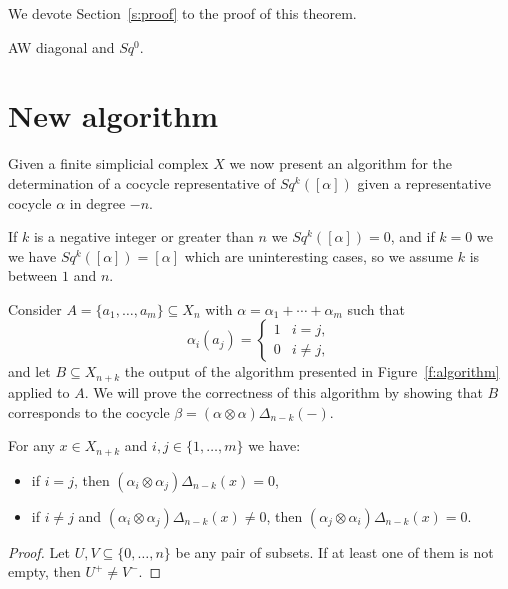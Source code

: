 We devote Section~\ref{s:proof} to the proof of this theorem.

\begin{example}
	AW diagonal and $Sq^0$.
\end{example}

\section{New algorithm}

Given a finite simplicial complex $X$ we now present an algorithm for the determination of a cocycle representative of $Sq^k([\alpha])$ given a representative cocycle $\alpha$ in degree $-n$.

If $k$ is a negative integer or greater than $n$ we $Sq^k([\alpha]) = 0$, and if $k = 0$ we we have $Sq^k([\alpha]) = [\alpha]$ which are uninteresting cases, so we assume $k$ is between $1$ and $n$.

Consider $A = \{a_1, \dots, a_m\} \subseteq X_n$ with $\alpha = \alpha_1 + \cdots + \alpha_m$ such that
\begin{equation*}
\alpha_i(a_j) = \begin{cases}
1 & i=j, \\ 0 & i\neq j,
\end{cases}
\end{equation*}
and let $B \subseteq X_{n+k}$ the output of the algorithm presented in Figure~\ref{f:algorithm} applied to $A$.
We will prove the correctness of this algorithm by showing that $B$ corresponds to the cocycle $\beta = (\alpha \otimes \alpha)\Delta_{n-k}(-)$.

\begin{lemma} \label{l:freeness}
	For any $x \in X_{n+k}$ and $i,j \in \{1,\dots,m\}$ we have:
	\begin{itemize}
		\item if $i=j$, then $(\alpha_i \otimes \alpha_j)\Delta_{n-k}(x) = 0$,
		\item if $i \neq j$ and $(\alpha_i \otimes \alpha_j)\Delta_{n-k}(x) \neq 0$, then $(\alpha_j \otimes \alpha_i)\Delta_{n-k}(x) = 0$.
	\end{itemize}
\end{lemma}

\begin{proof}
	Let $U, V \subseteq \{0, \dots, n\}$ be any pair of subsets. If at least one of them is not empty, then $U^+ \neq V^-$.
\end{proof}

